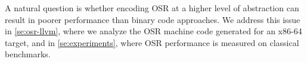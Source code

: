 \noindent A natural question is whether encoding OSR at a higher level of abstraction can result in poorer performance than binary code approaches. We address this issue in \mysection\ref{se:osr-llvm}, where we analyze the OSR machine code generated for an x86-64 target, and in \mysection\ref{se:experiments}, where OSR performance is measured on classical benchmarks.

  
  
  
  
  
  
  
  
  
  
  
  
  
  
  
  
  
  
  
  
  
  
  
  
  
  
  
  
  
  
  
  
  
  
  
  
  
  
  
  
  
  
  
  
  
  
  
  
  
  
  
  
  
  
  
  
  
  
  
  
  
  
  
  
  
  
  
  
  
  
  
  
  
  
  
  
  
  
  
  
  
  
  
  
  
  
  
  